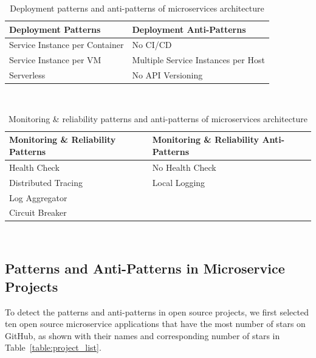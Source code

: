 \documentclass[11pt,a4paper,twocolumn]{article}
\begin{document}
\begin{table}[H]
\centering 
    \begin{tabular}{ 
  | >{\centering\arraybackslash} m{9em} 
  | >{\centering\arraybackslash} m{9em} | }
    \hline
    \rowcolor{bluepoli!40}
    \textbf{Deployment Patterns} & \textbf{Deployment Anti-Patterns}\T\B \\
    \hline \hline
    Service Instance per Container & No CI/CD\T\B\\
    \hline
    \rowcolor{bluepoli!10}
    Service Instance per VM & Multiple Service Instances per Host\T\B\\
    \hline
    Serverless & No API Versioning \T\B\\
    \hline
    \end{tabular}
    \\[10pt]
    \caption{Deployment patterns and anti-patterns of microservices architecture}
    \label{table:pattern_table_2}
\end{table}

\begin{table}[H]
\centering 
    \begin{tabular}{ 
  | >{\centering\arraybackslash} m{9em} 
  | >{\centering\arraybackslash} m{9em} | }
    \hline
    \rowcolor{bluepoli!40}
    \textbf{Monitoring \& Reliability Patterns} & \textbf{Monitoring \& Reliability Anti-Patterns}\T\B \\
    \hline \hline
    Health Check & No Health Check\T\B\\
    \hline
    \rowcolor{bluepoli!10}
    Distributed Tracing & Local Logging\T\B\\
    \hline
    Log Aggregator & \T\B\\
    \hline
    \rowcolor{bluepoli!10}
    Circuit Breaker & \T\B\\
    \hline
    \end{tabular}
    \\[10pt]
    \caption{Monitoring \& reliability patterns and anti-patterns of microservices architecture}
    \label{table:pattern_table_3}
\end{table}

\subsection{Patterns and Anti-Patterns in Microservice Projects}
\label{subsec:rq2}

To detect the patterns and anti-patterns in open source projects, we first selected ten open source microservice applications that have the most number of stars on GitHub, as shown with their names and corresponding number of stars in Table~\ref{table:project_list}.
\end{document}
